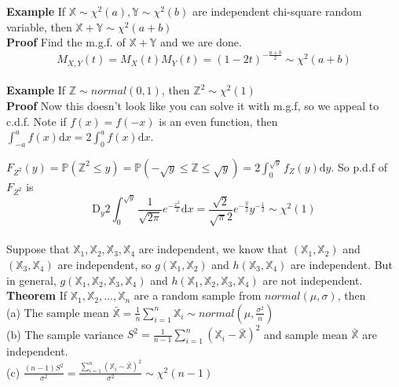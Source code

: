 \documentclass[a4paper,12pt]{article}
\begin{document}
\textbf{Example} If $\mathbb{X} \sim \chi^2(a), \mathbb{Y} \sim \chi^2(b)$ are independent chi-square random variable, then $\mathbb{X}+\mathbb{Y} \sim \chi^2(a+b)$\\

\textbf{Proof} Find the m.g.f. of $\mathbb{X}+\mathbb{Y}$ and we are done.
$$M_{X, Y}(t) = M_X(t)M_Y(t) = (1-2t)^{-\frac{a+b}{2}} \sim \chi^2(a+b)$$\\

\textbf{Example} If $\mathbb{Z} \sim normal(0, 1)$, then $\mathbb{Z}^2 \sim \chi^2(1)$\\

\textbf{Proof} Now this doesn't look like you can solve it with m.g.f, so we appeal to c.d.f. Note if $f(x) = f(-x)$ is an even function, then $\int_{-a}^a f(x) \mathrm{d}x = 2\int_0^a f(x) \mathrm{d}x$. 

$F_{Z^2}(y) = \mathbb{P}(\mathbb{Z}^2 \leq y ) = \mathbb{P}(-\sqrt{y} \leq \mathbb{Z} \leq \sqrt{y} ) = 2 \int_0^{\sqrt{y}} f_Z(y) \mathrm{d}y$. 
So p.d.f of $F_{Z^2}$ is 
$$\mathrm{D}_y 2\int_0^{\sqrt{y}} \frac{1}{\sqrt{2\pi}} e^{-\frac{x^2}{2}} \mathrm{d}x = \frac{\sqrt{2}}{\sqrt{\pi}2} e^{-\frac{y}{2}} y^{-\frac{1}{2}} \sim \chi^2(1)$$\\

Suppose that $\mathbb{X}_1, \mathbb{X}_2, \mathbb{X}_3, \mathbb{X}_4$ are independent, we know that $(\mathbb{X}_1, \mathbb{X}_2)$ and $(\mathbb{X}_3, \mathbb{X}_4)$ are independent, so $g(\mathbb{X}_1, \mathbb{X}_2)$ and $h(\mathbb{X}_3, \mathbb{X}_4)$ are independent. But in general, $g(\mathbb{X}_1, \mathbb{X}_2, \mathbb{X}_3, \mathbb{X}_4)$ and $h(\mathbb{X}_1, \mathbb{X}_2, \mathbb{X}_3, \mathbb{X}_4)$ are not independent.\\

\textbf{Theorem} If $\mathbb{X}_1, \mathbb{X}_2, ..., \mathbb{X}_n$ are a random sample from $normal(\mu, \sigma)$, then\\
(a) The sample mean $\bar{\mathbb{X}} = \frac{1}{n}\sum_{i=1}^n\mathbb{X}_i \sim normal(\mu, \frac{\sigma^2}{n})$\\
(b) The sample variance $S^2 = \frac{1}{n-1} \sum_{i=1}^n (\mathbb{X}_i-\bar{\mathbb{X}})^2$ and sample mean $\bar{\mathbb{X}}$ are independent.\\
(c) $\frac{(n-1)S^2}{\sigma^2} = \frac{\sum_{i=1}^n (\mathbb{X}_i-\bar{\mathbb{X}})^2}{\sigma^2} \sim \chi^2(n-1)$\\
\end{document}
